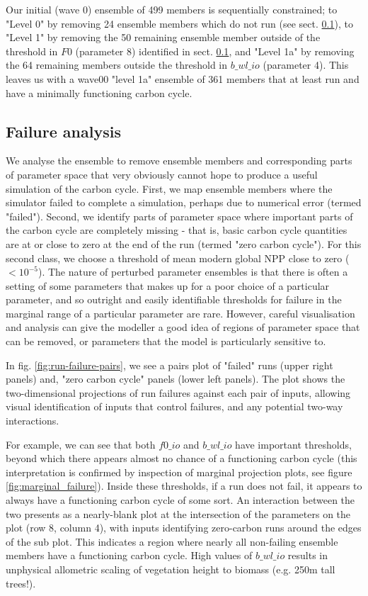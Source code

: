 \documentclass[gmd, manuscript]{copernicus}
\begin{document}
Our initial (wave 0) ensemble of 499 members is sequentially constrained; to "Level 0" by removing 24 ensemble members which do not run (see sect. \ref{ssec:failure-analysis}), to "Level 1" by removing the 50 remaining ensemble member outside of the threshold in $F0$ (parameter 8) identified in sect. \ref{ssec:failure-analysis}, and "Level 1a" by removing the 64 remaining members outside the threshold in $b\_wl\_io$ (parameter 4). This leaves us with a wave00 "level 1a" ensemble of 361 members that at least run and have a minimally functioning carbon cycle.

\subsection{Failure analysis}\label{ssec:failure-analysis}

We analyse the ensemble to remove ensemble members and corresponding parts of parameter space that very obviously cannot hope to produce a useful simulation of the carbon cycle. First, we map ensemble members where the simulator failed to complete a simulation, perhaps due to numerical error (termed "failed"). Second, we identify parts of parameter space where important parts of the carbon cycle are completely missing - that is, basic carbon cycle quantities are at or close to zero at the end of the run (termed "zero carbon cycle"). For this second class, we choose a threshold of mean modern global NPP close to zero ($<10^{-5}$).
The nature of perturbed parameter ensembles is that there is often a setting of some parameters that makes up for a poor choice of a particular parameter, and so outright and easily identifiable thresholds for failure in the marginal range of a particular parameter are rare. However, careful visualisation and analysis can give the modeller a good idea of regions of parameter space that can be removed, or parameters that the model is particularly sensitive to.

In fig. \ref{fig:run-failure-pairs}, we see a pairs plot of "failed" runs (upper right panels) and, "zero carbon cycle" panels (lower left panels). The plot shows the two-dimensional projections of run failures against each pair of inputs, allowing visual identification of inputs that control failures, and any potential two-way interactions.

For example, we can see that both $f0\_io$ and $b\_wl\_io$ have important thresholds, beyond which there appears almost no chance of a functioning carbon cycle (this interpretation is confirmed by inspection of marginal projection plots, see figure \ref{fig:marginal_failure}). Inside these thresholds, if a run does not fail, it appears to always have a functioning carbon cycle of some sort. An interaction between the two presents as a nearly-blank plot at the intersection of the parameters on the plot (row 8, column 4), with inputs identifying zero-carbon runs around the edges of the sub plot. This indicates a region where nearly all non-failing ensemble members have a functioning carbon cycle.
High values of $b\_wl\_io$ results in unphysical allometric scaling of vegetation height to biomass (e.g. 250m tall trees!).
\end{document}
